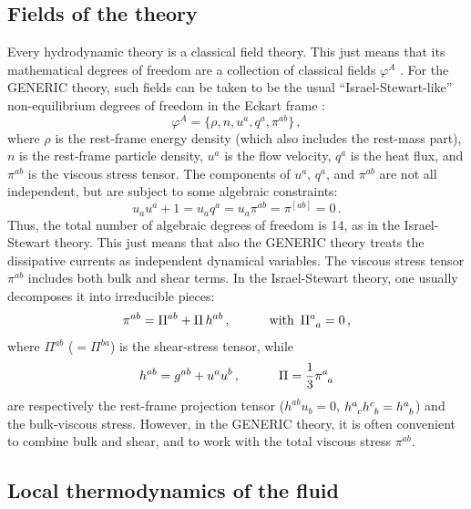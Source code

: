 \documentclass[a4paper, amsfonts, amssymb, amsmath, reprint, showkeys, nofootinbib, twoside, onecolumn, notitlepage]{revtex4-1}
\newcommand{\spc}{\quad \quad \quad}
\theoremstyle{definition}
\theoremstyle{theorem}
\begin{document}
\subsection{Fields of the theory}

Every hydrodynamic theory is a classical field theory. This just means that its mathematical degrees of freedom are a collection of classical fields $\varphi^A$ \citep{GavassinoFronntiers2021}. For the GENERIC theory, such fields can be taken to be the usual ``Israel-Stewart-like'' non-equilibrium degrees of freedom  in the Eckart frame \cite{Hishcock1983}:
\begin{equation}\label{choiceofFields}
\varphi^A = \{ \rho,n,u^a,q^a,\pi^{ab}  \} \, ,
\end{equation} 
where $\rho$ is the rest-frame energy density (which also includes the rest-mass part), $n$ is the rest-frame particle density, $u^a$ is the flow velocity, $q^a$ is the heat flux, and $\pi^{ab}$ is the viscous stress tensor. The components of $u^a$, $q^a$, and $\pi^{ab}$ are not all independent, but are subject to some algebraic constraints:
\begin{equation}
\label{algconstraints}
u_a u^a+1=u_a q^a= u_a \pi^{ab}=\pi^{[ab]}=0 \, .
\end{equation}
Thus, the total number of algebraic degrees of freedom is 14, as in the Israel-Stewart theory. This just means that also the GENERIC theory treats the dissipative currents as independent dynamical variables. The viscous stress tensor $\pi^{ab}$ includes both bulk and shear terms. In the Israel-Stewart theory, one usually decomposes it into irreducible pieces:
\begin{equation}\label{shearbulk}
\pi^{ab}=\Pi^{ab}+\Pi \, h^{ab}\, , \spc \text{with }\, \Pi\indices{^a _a}=0 \, ,
\end{equation}
where $\Pi^{ab}$ ($=\Pi^{ba}$) is the shear-stress tensor, while
\begin{equation}\label{proj}
 h^{ab}= g^{ab}+u^a u^b \, , \spc 
\Pi=  \dfrac{1}{3}\pi\indices{^a _a} 
\end{equation}
are respectively the rest-frame projection tensor ($h^{ab}u_b=0$, $h\indices{^a _c}h\indices{^c _b}=h\indices{^a _b}$) and the bulk-viscous stress. However, in the GENERIC theory, it is often convenient to combine bulk and shear, and to work with the total viscous stress $\pi^{ab}$.

\subsection{Local thermodynamics of the fluid}  
\end{document}
